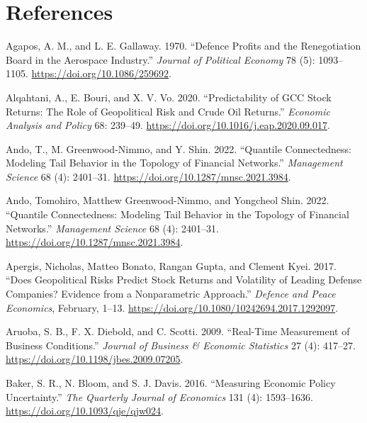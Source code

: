 \documentclass[
  letterpaper,
  DIV=11,
  numbers=noendperiod]{scrartcl}
\newlength{\cslhangindent}
\newlength{\cslentryspacingunit} %
\newenvironment{CSLReferences}[2] %
 {%
  \setlength{\parindent}{0pt}
  \ifodd #1
  \let\oldpar\par
  \def\par{\hangindent=\cslhangindent\oldpar}
  \fi
  \setlength{\parskip}{#2\cslentryspacingunit}
 }%
 {}
\begin{document}
\newpage{}

\hypertarget{references}{%
\section*{References}\label{references}}

\hypertarget{refs}{}
\begin{CSLReferences}{1}{0}
\leavevmode{}%
Agapos, A. M., and L. E. Gallaway. 1970. {``Defence Profits and the
Renegotiation Board in the Aerospace Industry.''} \emph{Journal of
Political Economy} 78 (5): 1093--1105.
\url{https://doi.org/10.1086/259692}.

\leavevmode{}%
Alqahtani, A., E. Bouri, and X. V. Vo. 2020. {``Predictability of GCC
Stock Returns: The Role of Geopolitical Risk and Crude Oil Returns.''}
\emph{Economic Analysis and Policy} 68: 239--49.
\url{https://doi.org/10.1016/j.eap.2020.09.017}.

\leavevmode{}%
Ando, T., M. Greenwood-Nimmo, and Y. Shin. 2022. {``Quantile
Connectedness: Modeling Tail Behavior in the Topology of Financial
Networks.''} \emph{Management Science} 68 (4): 2401--31.
\url{https://doi.org/10.1287/mnsc.2021.3984}.

\leavevmode{}%
Ando, Tomohiro, Matthew Greenwood-Nimmo, and Yongcheol Shin. 2022.
{``{Quantile Connectedness: Modeling Tail Behavior in the Topology of
Financial Networks}.''} \emph{Management Science} 68 (4): 2401--31.
\url{https://doi.org/10.1287/mnsc.2021.3984}.

\leavevmode{}%
Apergis, Nicholas, Matteo Bonato, Rangan Gupta, and Clement Kyei. 2017.
{``Does Geopolitical Risks Predict Stock Returns and Volatility of
Leading Defense Companies? Evidence from a Nonparametric Approach.''}
\emph{Defence and Peace Economics}, February, 1--13.
\url{https://doi.org/10.1080/10242694.2017.1292097}.

\leavevmode{}%
Aruoba, S. B., F. X. Diebold, and C. Scotti. 2009. {``Real-Time
Measurement of Business Conditions.''} \emph{Journal of Business \&
Economic Statistics} 27 (4): 417--27.
\url{https://doi.org/10.1198/jbes.2009.07205}.

\leavevmode{}%
Baker, S. R., N. Bloom, and S. J. Davis. 2016. {``Measuring Economic
Policy Uncertainty.''} \emph{The Quarterly Journal of Economics} 131
(4): 1593--1636. \url{https://doi.org/10.1093/qje/qjw024}.


\end{CSLReferences}
\end{document}
